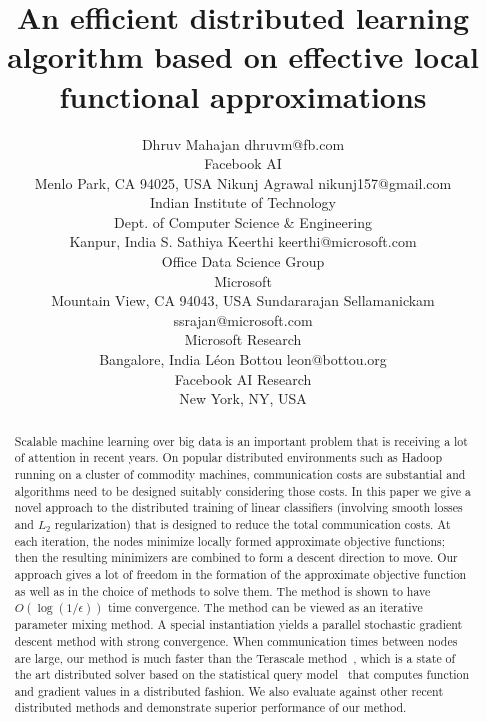 \documentclass[twoside, 11pt]{article}
\begin{document}
\sloppy

\title{An efficient distributed learning algorithm based on effective local functional approximations}

\author{\name Dhruv Mahajan \email dhruvm@fb.com \\
       \addr Facebook AI\\
       Menlo Park, CA 94025, USA
       \AND
       \name Nikunj Agrawal \email nikunj157@gmail.com \\
       \addr Indian Institute of Technology \\
       Dept. of Computer Science \& Engineering \\
       Kanpur, India
       \AND
       \name S. Sathiya Keerthi \email keerthi@microsoft.com \\
       \addr Office Data Science Group\\
       Microsoft\\
       Mountain View, CA 94043, USA
       \AND
       \name Sundararajan Sellamanickam \email ssrajan@microsoft.com \\
       \addr Microsoft Research \\
       Bangalore, India
       \AND
       \name L\'{e}on Bottou \email leon@bottou.org \\
      \addr Facebook AI Research \\
      New York, NY, USA
       }


\maketitle
\begin{abstract}%
Scalable machine learning over big data is an important problem that is receiving a lot of attention in recent years. On popular distributed environments such as Hadoop running on a cluster of commodity machines, communication costs are substantial and algorithms need to be designed suitably considering those costs.
In this paper we give a novel approach to the distributed training of linear classifiers (involving smooth losses and $L_2$ regularization) that is designed to reduce the total communication costs. At each iteration, the nodes minimize locally formed approximate objective functions; then the resulting minimizers are combined to form a descent direction to move. Our approach gives a lot of freedom in the formation of the approximate objective function as well as in the choice of methods to solve them. The method is shown to have $O(\log(1/\epsilon))$ time convergence. The method can be viewed as an iterative parameter mixing method. A special instantiation yields a parallel stochastic gradient descent method with strong convergence. When communication times between nodes are large, our method is much faster than the Terascale method~\citep{agarwal2011}, which is a state of the art distributed solver based on the statistical query model~\citep{chu2006} that computes function and gradient values in a distributed fashion. We also evaluate against other recent distributed methods and demonstrate superior performance of our method.
\end{abstract}
\end{document}
